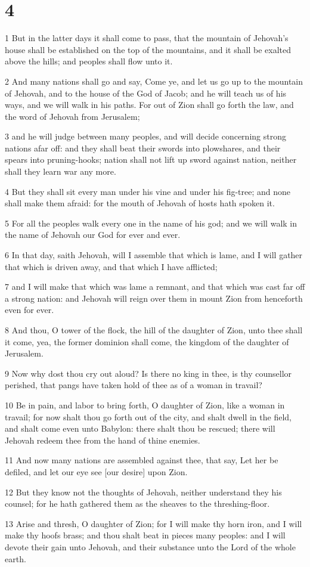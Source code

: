 \chapter{4}

\par 1 But in the latter days it shall come to pass, that the mountain of Jehovah's house shall be established on the top of the mountains, and it shall be exalted above the hills; and peoples shall flow unto it.
\par 2 And many nations shall go and say, Come ye, and let us go up to the mountain of Jehovah, and to the house of the God of Jacob; and he will teach us of his ways, and we will walk in his paths. For out of Zion shall go forth the law, and the word of Jehovah from Jerusalem;
\par 3 and he will judge between many peoples, and will decide concerning strong nations afar off: and they shall beat their swords into plowshares, and their spears into pruning-hooks; nation shall not lift up sword against nation, neither shall they learn war any more.
\par 4 But they shall sit every man under his vine and under his fig-tree; and none shall make them afraid: for the mouth of Jehovah of hosts hath spoken it.
\par 5 For all the peoples walk every one in the name of his god; and we will walk in the name of Jehovah our God for ever and ever.
\par 6 In that day, saith Jehovah, will I assemble that which is lame, and I will gather that which is driven away, and that which I have afflicted;
\par 7 and I will make that which was lame a remnant, and that which was cast far off a strong nation: and Jehovah will reign over them in mount Zion from henceforth even for ever.
\par 8 And thou, O tower of the flock, the hill of the daughter of Zion, unto thee shall it come, yea, the former dominion shall come, the kingdom of the daughter of Jerusalem.
\par 9 Now why dost thou cry out aloud? Is there no king in thee, is thy counsellor perished, that pangs have taken hold of thee as of a woman in travail?
\par 10 Be in pain, and labor to bring forth, O daughter of Zion, like a woman in travail; for now shalt thou go forth out of the city, and shalt dwell in the field, and shalt come even unto Babylon: there shalt thou be rescued; there will Jehovah redeem thee from the hand of thine enemies.
\par 11 And now many nations are assembled against thee, that say, Let her be defiled, and let our eye see [our desire] upon Zion.
\par 12 But they know not the thoughts of Jehovah, neither understand they his counsel; for he hath gathered them as the sheaves to the threshing-floor.
\par 13 Arise and thresh, O daughter of Zion; for I will make thy horn iron, and I will make thy hoofs brass; and thou shalt beat in pieces many peoples: and I will devote their gain unto Jehovah, and their substance unto the Lord of the whole earth.

